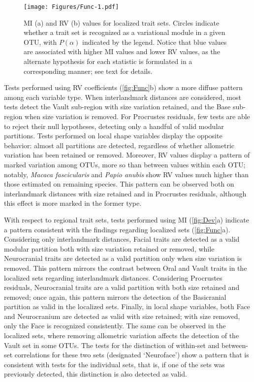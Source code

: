 \documentclass[12pt,twoside]{report}
\begin{document}
\begin{figure}[htbp]
\centering
\texttt{[image: Figures/Func-1.pdf]}
\caption{MI (a) and RV (b) values for localized trait sets. Circles
indicate whether a trait set is recognized as a variational module in a
given OTU, with $P(\alpha)$ indicated by the legend. Notice that blue
values are associated with higher MI values and lower RV values, as the
alternate hypothesis for each statistic is formulated in a corresponding
manner; see text for details. \label{fig:Func}}
\end{figure}

Tests performed using RV coefficients (\autoref{fig:Func}b) show a more
diffuse pattern among each variable type. When interlandmark distances
are considered, most tests detect the Vault sub-region with size
variation retained, and the Base sub-region when size variation is
removed. For Procrustes residuals, few tests are able to reject their
null hypotheses, detecting only a handful of valid modular partitions.
Tests performed on local shape variables display the opposite behavior:
almost all partitions are detected, regardless of whether allometric
variation has been retained or removed. Moreover, RV values display a
pattern of marked variation among OTUs, more so than between values
within each OTU; notably, \emph{Macaca fascicularis} and \emph{Papio
anubis} show RV values much higher than those estimated on remaining
species. This pattern can be observed both on interlandmark distances
with size retained and in Procrustes residuals, although this effect is
more marked in the former type.

With respect to regional trait sets, tests performed using MI
(\autoref{fig:Dev}a) indicate a pattern consistent with the findings
regarding localized sets (\autoref{fig:Func}a). Considering only
interlandmark distances, Facial traits are detected as a valid modular
partition both with size variation retained or removed, while
Neurocranial traits are detected as a valid partition only when size
variation is removed. This pattern mirrors the contrast between Oral and
Vault traits in the localized sets regarding interlandmark distances.
Considering Procrustes residuals, Neurocranial traits are a valid
partition with both size retained and removed; once again, this pattern
mirrors the detection of the Basicranial partition as valid in the
localized sets. Finally, in local shape variables, both Face and
Neurocranium are detected as valid with size retained; with size
removed, only the Face is recognized consistently. The same can be
observed in the localized sets, where removing allometric variation
affects the detection of the Vault set in some OTUs. The tests for the
distinction of within-set and between-set correlations for these two
sets (designated `Neuroface') show a pattern that is consistent with
tests for the individual sets, that is, if one of the sets was
previously detected, this distinction is also detected as valid.
\end{document}
